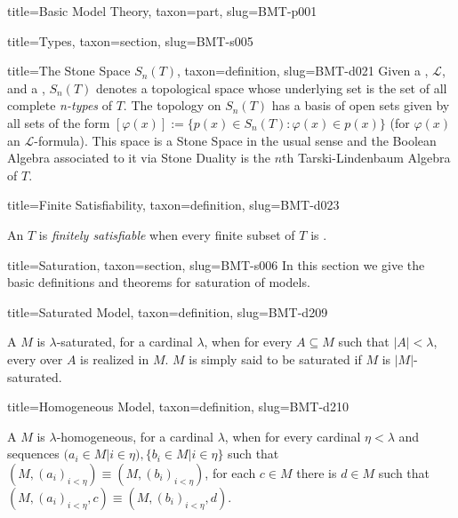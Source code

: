 \documentclass[a4paper]{article}
\begin{document}
\begin{tree}{title={Basic Model Theory}, taxon={part}, slug={BMT-p001}}
\begin{tree}{title={Types}, taxon={section}, slug={BMT-s005}}
\begin{tree}{title={The Stone Space \(S_n(T)\)}, taxon={definition}, slug={BMT-d021}}
Given a , \(\mathcal {L}\), and a ,
\(S_n(T)\) denotes a topological space whose underlying set is the set of all complete \emph{n-types} of \(T\).
The topology on \(S_n(T)\) has a basis of open sets given by all sets of the form \([ \varphi (x)] :=  \{ p(x) \in  S_n(T):
 \varphi (x)  \in  p(x) \}\) (for \(\varphi (x)\) an \(\mathcal {L}\)-formula).
This space is a Stone Space in the usual sense and the Boolean Algebra associated to it via Stone Duality is
the \(n\)th Tarski-Lindenbaum Algebra of \(T\).
\end{tree}

\begin{tree}{title={Finite Satisfiability}, taxon={definition}, slug={BMT-d023}}

    An  \(T\) is \emph{finitely satisfiable} when every finite subset of \(T\) is .

\end{tree}

\end{tree}


  
  
\begin{tree}{title={Saturation}, taxon={section}, slug={BMT-s006}}
In this section we give the basic definitions and theorems for saturation of models.
\begin{tree}{title={Saturated Model}, taxon={definition}, slug={BMT-d209}}

    A  \(M\) is \(\lambda\)-saturated, for a cardinal \(\lambda\), when for every \(A \subseteq  M\) such that \(|A|< \lambda\), every  over \(A\) is realized in \(M\). \(M\) is simply said to be saturated if \(M\) is \(|M|\)-saturated.

\end{tree}

\begin{tree}{title={Homogeneous Model}, taxon={definition}, slug={BMT-d210}}

    A  \(M\) is \(\lambda\)-homogeneous, for a cardinal \(\lambda\), 
    when for every cardinal \(\eta < \lambda\) and sequences \((a_i \in  M|i \in \eta ), \{ b_i \in  M|i \in \eta \}\) such that \((M,(a_i)_{i< \eta }) \equiv (M,(b_i)_{i< \eta })\), 
    for each \(c \in  M\) there is \(d \in  M\) such that \((M,(a_i)_{i< \eta },c) \equiv (M,(b_i)_{i< \eta },d)\). 


\end{tree}
\end{tree}
\end{tree}
\end{document}
